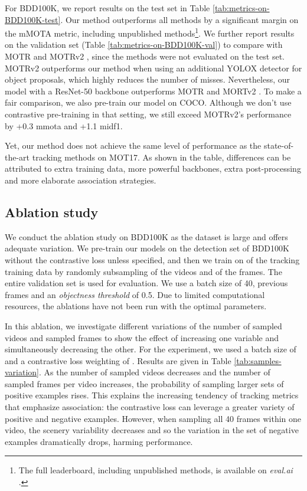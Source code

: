  For BDD100K, we report results on the test set in Table \ref{tab:metrics-on-BDD100K-test}. 
Our method outperforms all methods by a significant margin on the mMOTA metric, including unpublished methods\footnote{The full leaderboard, including unpublished methods, is available on \textit{eval.ai} \cite{evalAI:Online}.}.
We further report results on the validation set (Table \ref{tab:metrics-on-BDD100K-val}) to compare with MOTR \cite{zeng2022motr} and MOTRv2 \cite{Zhang_2023_CVPR}, since the methods were not evaluated on the test set.
MOTRv2 outperforms our method when using an additional YOLOX \cite{ge2021yolox} detector for object proposals, which highly reduces the number of misses.
Nevertheless, our model with a ResNet-50 backbone outperforms MOTR \cite{zeng2022motr} and MORTv2 \cite{Zhang_2023_CVPR}. 
To make a fair comparison, we also pre-train our model on COCO. Although we don't use contrastive pre-training in that setting, we still exceed MOTRv2's performance by +0.3 \ac{mmota} and +1.1 \ac{midf1}. 

 Yet, our method does not achieve the same level of performance as the state-of-the-art tracking methods on MOT17. As shown in the table, differences can be attributed to extra training data, more powerful backbones, extra post-processing and more elaborate association strategies. 

\vspace{-0.2em}

\subsection{Ablation study}

We conduct the ablation study on BDD100K \cite{bdd100k} as the dataset is large and offers adequate variation. We pre-train our models on the detection set of BDD100K without the contrastive loss unless specified, and then we train on  of the tracking training data by randomly subsampling  of the videos and  of the frames. The entire validation set is used for evaluation. We use a batch size of 40,  previous frames and an \textit{objectness threshold} of 0.5. Due to limited computational resources, the ablations have not been run with the optimal parameters.

 In this ablation, we investigate different variations of the number of sampled videos  and sampled frames  to show the effect of increasing one variable and simultaneously decreasing the other. For the experiment, we used a batch size of  and a contrastive loss weighting of . Results are given in Table \ref{tab:samples-variation}. As the number of sampled videos  decreases and the number of sampled frames per video  increases, the probability of sampling larger sets of positive examples rises. This explains the increasing tendency of tracking metrics that emphasize association: the contrastive loss can leverage a greater variety of positive and negative examples. 
However, when sampling all 40 frames within one video, the scenery variability decreases and so the variation in the set of negative examples dramatically drops, harming performance.

